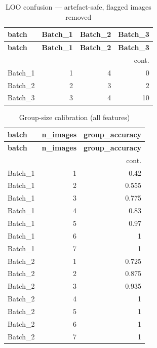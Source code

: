 \documentclass[11pt,a4paper]{article}
\begin{document}
\normalsize
\scriptsize
\begin{longtable}{lrrr}
\caption{LOO confusion --- artefact-safe, flagged images removed}\label{tab:confsafe_noflag}\\
\toprule
\textbf{batch} & \textbf{Batch\_1} & \textbf{Batch\_2} & \textbf{Batch\_3} \\
\midrule
\endfirsthead
\toprule \textbf{batch} & \textbf{Batch\_1} & \textbf{Batch\_2} & \textbf{Batch\_3} \\
\midrule
\endhead
\midrule\multicolumn{4}{r}{\footnotesize cont.}\\\midrule\endfoot
\bottomrule\endlastfoot
Batch\_1 & 1 & 4 & 0 \\
Batch\_2 & 2 & 3 & 2 \\
Batch\_3 & 3 & 4 & 10 \\
\end{longtable}
\normalsize
\scriptsize
\begin{longtable}{lrr}
\caption{Group-size calibration (all features)}\label{tab:need}\\
\toprule
\textbf{batch} & \textbf{n\_images} & \textbf{group\_accuracy} \\
\midrule
\endfirsthead
\toprule \textbf{batch} & \textbf{n\_images} & \textbf{group\_accuracy} \\
\midrule
\endhead
\midrule\multicolumn{3}{r}{\footnotesize cont.}\\\midrule\endfoot
\bottomrule\endlastfoot
Batch\_1 & 1 & 0.42 \\
Batch\_1 & 2 & 0.555 \\
Batch\_1 & 3 & 0.775 \\
Batch\_1 & 4 & 0.83 \\
Batch\_1 & 5 & 0.97 \\
Batch\_1 & 6 & 1 \\
Batch\_1 & 7 & 1 \\
Batch\_2 & 1 & 0.725 \\
Batch\_2 & 2 & 0.875 \\
Batch\_2 & 3 & 0.935 \\
Batch\_2 & 4 & 1 \\
Batch\_2 & 5 & 1 \\
Batch\_2 & 6 & 1 \\
Batch\_2 & 7 & 1 \\
\end{longtable}
\normalsize\scriptsize
\end{document}
